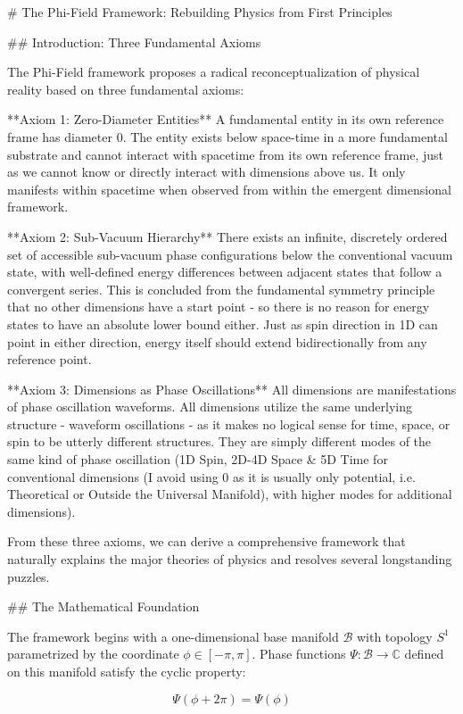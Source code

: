 # The Phi-Field Framework: Rebuilding Physics from First Principles

## Introduction: Three Fundamental Axioms

The Phi-Field framework proposes a radical reconceptualization of physical reality based on three fundamental axioms:

**Axiom 1: Zero-Diameter Entities**
A fundamental entity in its own reference frame has diameter 0. The entity exists below space-time in a more fundamental substrate and cannot interact with spacetime from its own reference frame, just as we cannot know or directly interact with dimensions above us. It only manifests within spacetime when observed from within the emergent dimensional framework.

**Axiom 2: Sub-Vacuum Hierarchy**
There exists an infinite, discretely ordered set of accessible sub-vacuum phase configurations below the conventional vacuum state, with well-defined energy differences between adjacent states that follow a convergent series. This is concluded from the fundamental symmetry principle that no other dimensions have a start point - so there is no reason for energy states to have an absolute lower bound either. Just as spin direction in 1D can point in either direction, energy itself should extend bidirectionally from any reference point.

**Axiom 3: Dimensions as Phase Oscillations**
All dimensions are manifestations of phase oscillation waveforms. All dimensions utilize the same underlying structure - waveform oscillations - as it makes no logical sense for time, space, or spin to be utterly different structures. They are simply different modes of the same kind of phase oscillation (1D Spin, 2D-4D Space & 5D Time for conventional dimensions (I avoid using 0 as it is usually only potential, i.e. Theoretical or Outside the Universal Manifold), with higher modes for additional dimensions).

From these three axioms, we can derive a comprehensive framework that naturally explains the major theories of physics and resolves several longstanding puzzles.

## The Mathematical Foundation

The framework begins with a one-dimensional base manifold $\mathcal{B}$ with topology $S^1$ parametrized by the coordinate $\phi \in [-\pi, \pi]$. Phase functions $\Psi: \mathcal{B} \rightarrow \mathbb{C}$ defined on this manifold satisfy the cyclic property:

$$\Psi(\phi + 2\pi) = \Psi(\phi)$$

